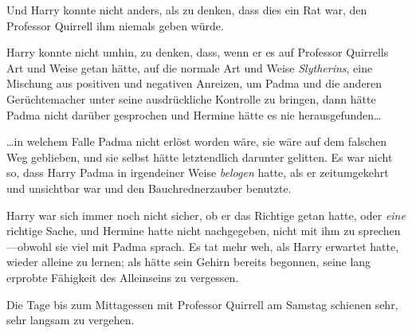 Und Harry konnte nicht anders, als zu denken, dass dies ein Rat war, den Professor Quirrell ihm niemals geben würde.

Harry konnte nicht umhin, zu denken, dass, wenn er es auf Professor Quirrells Art und Weise getan hätte, auf die normale Art und Weise \emph{Slytherins}, eine Mischung aus positiven und negativen Anreizen, um Padma und die anderen Gerüchtemacher unter seine ausdrückliche Kontrolle zu bringen, dann hätte Padma nicht darüber gesprochen und Hermine hätte es nie herausgefunden…

…in welchem Falle Padma nicht erlöst worden wäre, sie wäre auf dem falschen Weg geblieben, und sie selbst hätte letztendlich darunter gelitten. Es war nicht so, dass Harry Padma in irgendeiner Weise \emph{belogen} hatte, als er zeitumgekehrt und unsichtbar war und den Bauchrednerzauber benutzte.

Harry war sich immer noch nicht sicher, ob er das Richtige getan hatte, oder \emph{eine} richtige Sache, und Hermine hatte nicht nachgegeben, nicht mit ihm zu sprechen—obwohl sie viel mit Padma sprach. Es tat mehr weh, als Harry erwartet hatte, wieder alleine zu lernen; als hätte sein Gehirn bereits begonnen, seine lang erprobte Fähigkeit des Alleinseins zu vergessen.

Die Tage bis zum Mittagessen mit Professor Quirrell am Samstag schienen sehr, sehr langsam zu vergehen.

